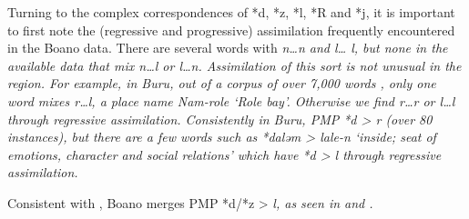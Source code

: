 
Turning to the complex correspondences of *d,
*z, *l, *R and *j, it is important to first note the (regressive
and progressive) assimilation frequently encountered in the Boano data.
There are several words with \it{n{\ldots}n}
and \it{l{\ldots} l}, but none in the available data that mix
\it{n{\ldots}l} or \it{l{\ldots}n}.
Assimilation of this sort is not unusual in the region.
For example, in Buru,
out of a corpus of over 7,000 words \citep{GrimesGrimes2020},
only one word mixes \it{r{\ldots}l},
a place name \it{Nam-role} ‘Role bay’.
Otherwise we find \it{r{\ldots}r} or \it{l{\ldots}l} through regressive assimilation.
Consistently in Buru, PMP *d > \it{r} (over 80 instances),
but there are a few words such as *daləm > \it{lale-n} ‘inside;
seat of emotions, character and social relations’ which have *d > \it{l} through regressive assimilation.

Consistent with , Boano merges PMP *d/*z > \it{l},
as seen in  and .

